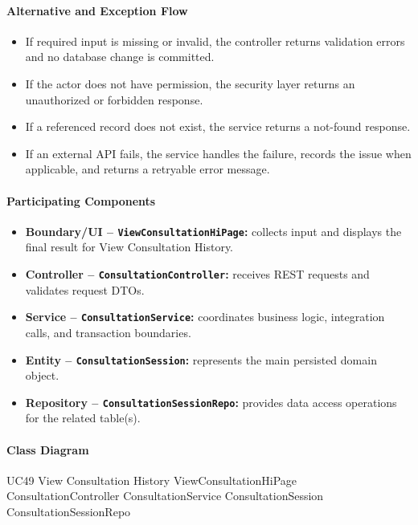 \paragraph{Alternative and Exception Flow}

\begin{itemize}
    \item If required input is missing or invalid, the controller returns validation errors and no database change is committed.
    \item If the actor does not have permission, the security layer returns an unauthorized or forbidden response.
    \item If a referenced record does not exist, the service returns a not-found response.
    \item If an external API fails, the service handles the failure, records the issue when applicable, and returns a retryable error message.
\end{itemize}

\paragraph{Participating Components}

\begin{itemize}
    \item \textbf{Boundary/UI -- \texttt{ViewConsultationHiPage}:} collects input and displays the final result for View Consultation History.
    \item \textbf{Controller -- \texttt{ConsultationController}:} receives REST requests and validates request DTOs.
    \item \textbf{Service -- \texttt{ConsultationService}:} coordinates business logic, integration calls, and transaction boundaries.
    \item \textbf{Entity -- \texttt{ConsultationSession}:} represents the main persisted domain object.
    \item \textbf{Repository -- \texttt{ConsultationSessionRepo}:} provides data access operations for the related table(s).
\end{itemize}

\paragraph{Class Diagram}

\ClassDiagram
{UC49 View Consultation History}
{ViewConsultationHiPage}
{ConsultationController}
{ConsultationService}
{ConsultationSession}
{ConsultationSessionRepo}

